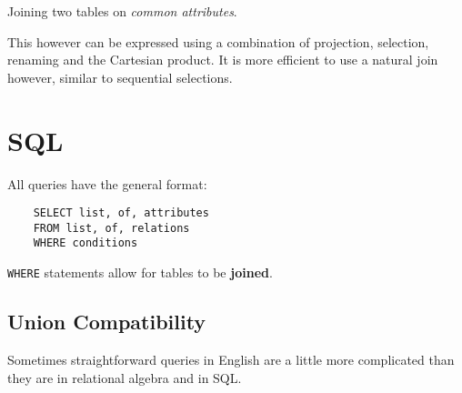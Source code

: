 \documentclass{article}
\begin{document}
Joining two tables on \textit{common attributes}.

This however can be expressed using a combination of projection, selection, renaming and the Cartesian product. It is more efficient to use a natural join however, similar to sequential selections.

\section{SQL}

All queries have the general format:

\begin{lstlisting}
    SELECT list, of, attributes
    FROM list, of, relations
    WHERE conditions
\end{lstlisting}

\texttt{WHERE} statements allow for tables to be \textbf{joined}.

\subsection{Union Compatibility}

Sometimes straightforward queries in English are a little more complicated than they are in relational algebra and in SQL. 
\end{document}
